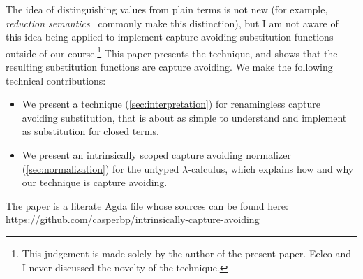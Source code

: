 The idea of distinguishing values from plain terms is not new (for example, \emph{reduction semantics}~\cite{FelleisenH92} commonly make this distinction), but I am not aware of this idea being applied to implement capture avoiding substitution functions outside of our course.\footnote{This judgement is made solely by the author of the present paper. Eelco and I never discussed the novelty of the technique.}
This paper presents the technique, and shows that the resulting substitution functions are capture avoiding.
We make the following technical contributions:
%
\begin{itemize}
\item We present a technique (\cref{sec:interpretation}) for renamingless capture avoiding substitution, that is about as simple to understand and implement as substitution for closed terms.
\item We present an intrinsically scoped capture avoiding normalizer (\cref{sec:normalization}) for the untyped $\lambda$-calculus, which explains how and why our technique is capture avoiding.
\end{itemize}
%
The paper is a literate Agda file whose sources can be found here: \url{https://github.com/casperbp/intrinsically-capture-avoiding}


